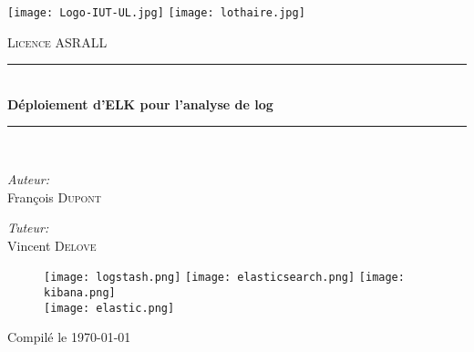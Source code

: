 \begin{titlepage}
\begin{center}
 \newcommand{\HRule}{\rule{\linewidth}{0.5mm}}

\texttt{[image: Logo-IUT-UL.jpg]}\hfill
\texttt{[image: lothaire.jpg]}
\vspace{1cm}

\textsc{\large Licence ASRALL}
\vspace{0.5cm}

\HRule \\[0.4cm]
{ \Large \bfseries Déploiement d'ELK pour l'analyse de log\\[0.4cm] }

\HRule \\[1.0cm]

\noindent
\begin{minipage}{0.5\textwidth}
\begin{flushleft} \large
\emph{Auteur:}\\
François \textsc{Dupont}\\
\end{flushleft}
\end{minipage}%
\begin{minipage}{0.5\textwidth}
\begin{flushright} \large
\emph{Tuteur:} \\
Vincent \textsc{Delove}
\end{flushright}
\end{minipage}

%
\vspace{1cm}

\begin{figure}[h]
    \centering
    \texttt{[image: logstash.png]}
    \hfill
    \texttt{[image: elasticsearch.png]}
    \hfill
    \texttt{[image: kibana.png]}
    \\[20mm]
    \texttt{[image: elastic.png]}
\end{figure}

\vspace{3mm}
{Compilé le \today}%

\end{center}
\end{titlepage}

